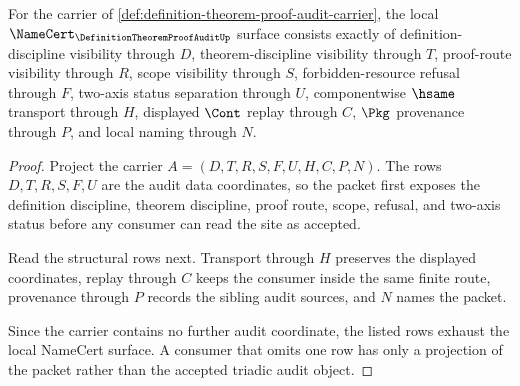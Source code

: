 \begin{theorem}
\label{thm:definition-theorem-proof-audit-namecert-obligations}
For the carrier of \autoref{def:definition-theorem-proof-audit-carrier}, the local $\NameCert_{\DefinitionTheoremProofAuditUp}$ surface consists exactly of definition-discipline visibility through $D$, theorem-discipline visibility through $T$, proof-route visibility through $R$, scope visibility through $S$, forbidden-resource refusal through $F$, two-axis status separation through $U$, componentwise $\hsame$ transport through $H$, displayed $\Cont$ replay through $C$, $\Pkg$ provenance through $P$, and local naming through $N$.
\end{theorem}
\begin{proof}
Project the carrier $A=(D,T,R,S,F,U,H,C,P,N)$. The rows $D,T,R,S,F,U$ are the audit data coordinates, so the packet first exposes the definition discipline, theorem discipline, proof route, scope, refusal, and two-axis status before any consumer can read the site as accepted.

Read the structural rows next. Transport through $H$ preserves the displayed coordinates, replay through $C$ keeps the consumer inside the same finite route, provenance through $P$ records the sibling audit sources, and $N$ names the packet.

Since the carrier contains no further audit coordinate, the listed rows exhaust the local NameCert surface. A consumer that omits one row has only a projection of the packet rather than the accepted triadic audit object.
\end{proof}

